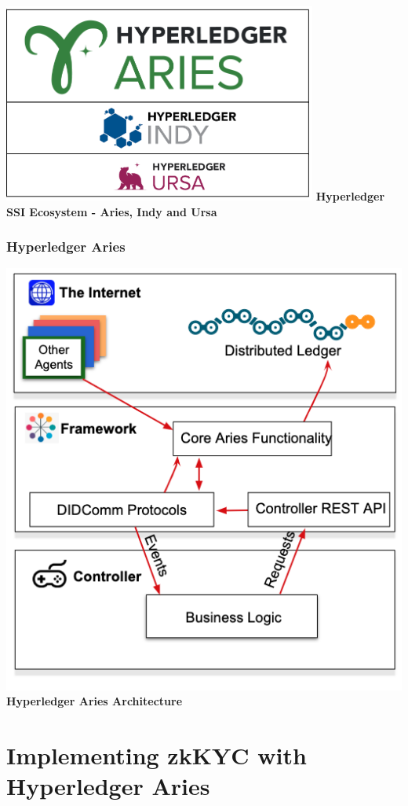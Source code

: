 \documentclass[
]{report}
\begin{document}
\includegraphics{eco.png} \textbf{Hyperledger SSI Ecosystem - Aries,
Indy and Ursa}

\subsubsection{Hyperledger Aries}

\includegraphics{aca-py.png} \textbf{Hyperledger Aries Architecture}

\section{Implementing zkKYC with Hyperledger Aries}
\end{document}
